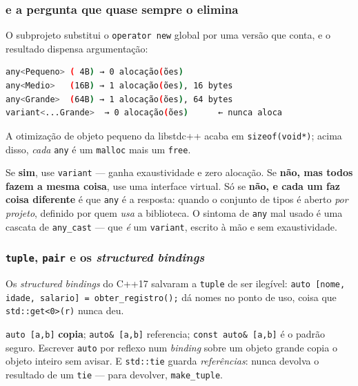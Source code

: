 \subsubsection{ e a pergunta que quase sempre o elimina}

O subprojeto substitui o \texttt{operator new} global por uma versão que conta,
e o resultado dispensa argumentação:

\begin{lstlisting}[style=bt, language=bash,
    caption={Saída de \texttt{src/vocabulary\_types/}: alocações contadas.}]
any<Pequeno> ( 4B) → 0 alocação(ões)
any<Medio>   (16B) → 1 alocação(ões), 16 bytes
any<Grande>  (64B) → 1 alocação(ões), 64 bytes
variant<...Grande>  → 0 alocação(ões)      ← nunca aloca
\end{lstlisting}

A otimização de objeto pequeno da libstdc++ acaba em \texttt{sizeof(void*)};
acima disso, \emph{cada} \texttt{any} é um \texttt{malloc} mais um
\texttt{free}.

\begin{regra}
Se \textbf{sim}, use \texttt{variant} --- ganha exaustividade e zero alocação.
Se \textbf{não, mas todos fazem a mesma coisa}, use uma interface virtual. Só
se \textbf{não, e cada um faz coisa diferente} é que \texttt{any} é a resposta:
quando o conjunto de tipos é aberto \emph{por projeto}, definido por quem
\emph{usa} a biblioteca. O sintoma de \texttt{any} mal usado é uma cascata de
\texttt{any\_cast} --- que \emph{é} um \texttt{variant}, escrito à mão e sem
exaustividade.
\end{regra}

\subsubsection{\texttt{tuple}, \texttt{pair} e os \emph{structured bindings}}

Os \emph{structured bindings} do C++17 salvaram a \texttt{tuple} de ser
ilegível: \texttt{auto [nome, idade, salario] = obter\_registro();} dá nomes no
ponto de uso, coisa que \texttt{std::get<0>(r)} nunca deu.

\begin{armadilha}
\texttt{auto [a,b]} \textbf{copia}; \texttt{auto\& [a,b]} referencia;
\texttt{const auto\& [a,b]} é o padrão seguro. Escrever \texttt{auto} por
reflexo num \emph{binding} sobre um objeto grande copia o objeto inteiro sem
avisar. E \texttt{std::tie} guarda \emph{referências}: nunca devolva o resultado
de um \texttt{tie} --- para devolver, \texttt{make\_tuple}.
\end{armadilha}

